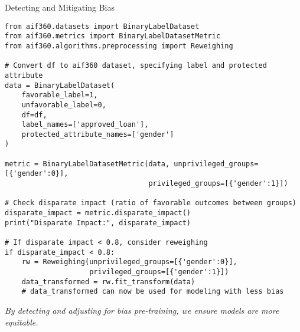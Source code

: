 \documentclass[aspectratio=169]{beamer}
\begin{document}
%
%
\begin{frame}{Detecting and Mitigating Bias}
\begin{verbatim}
from aif360.datasets import BinaryLabelDataset
from aif360.metrics import BinaryLabelDatasetMetric
from aif360.algorithms.preprocessing import Reweighing

# Convert df to aif360 dataset, specifying label and protected attribute
data = BinaryLabelDataset(
    favorable_label=1,
    unfavorable_label=0,
    df=df,
    label_names=['approved_loan'],
    protected_attribute_names=['gender']
)

metric = BinaryLabelDatasetMetric(data, unprivileged_groups=[{'gender':0}],
                                  privileged_groups=[{'gender':1}])

# Check disparate impact (ratio of favorable outcomes between groups)
disparate_impact = metric.disparate_impact()
print("Disparate Impact:", disparate_impact)

# If disparate impact < 0.8, consider reweighing
if disparate_impact < 0.8:
    rw = Reweighing(unprivileged_groups=[{'gender':0}],
                    privileged_groups=[{'gender':1}])
    data_transformed = rw.fit_transform(data)
    # data_transformed can now be used for modeling with less bias
\end{verbatim}

\vspace{0.8em}
\emph{By detecting and adjusting for bias pre-training, we ensure models are more equitable.}
\end{frame}
\end{document}
